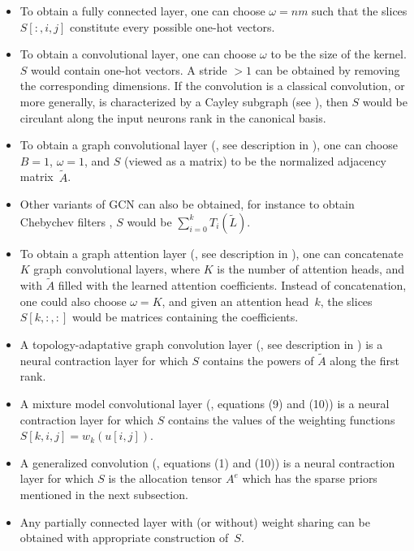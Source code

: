 \begin{itemize}%
\item[\ding{227}] To obtain a fully connected layer, one can choose $\omega = nm$ such that the slices $S[:,i,j]$ constitute every possible one-hot vectors.
\item[\ding{227}] To obtain a convolutional layer, one can choose $\omega$ to be the size of the kernel. $S$ would contain one-hot vectors. A stride $> 1$ can be obtained by removing the corresponding dimensions. If the convolution is a classical convolution, or more generally, is characterized by a Cayley subgraph (see ), then $S$ would be circulant along the input neurons rank in the canonical basis.
\item[\ding{227}] To obtain a graph convolutional layer (\cite{kipf2016semi}, see description in ), one can choose $B = 1$, $\omega = 1$, and $S$ (viewed as a matrix) to be the normalized adjacency matrix~$\widetilde{A}$.
\item[\ding{227}] Other variants of GCN can also be obtained, for instance to obtain Chebychev filters \citep{defferrard2016convolutional}, $S$ would be $\sum_{i=0}^k T_i(\widetilde{L})$.
\item[\ding{227}] To obtain a graph attention layer (\cite{velickovic2017graph}, see description in ), one can concatenate $K$ graph convolutional layers, where $K$ is the number of attention heads, and with $\widetilde{A}$ filled with the learned attention coefficients. Instead of concatenation, one could also choose $\omega=K$, and given an attention head~$k$, the slices $S[k,:,:]$ would be matrices containing the coefficients.
\item[\ding{227}] A topology-adaptative graph convolution layer (\cite{du2017topology}, see description in ) is a neural contraction layer for which $S$ contains the powers of $\widetilde{A}$ along the first rank.
\item[\ding{227}] A mixture model convolutional layer (\cite{monti2016geometric}, equations (9) and (10)) is a neural contraction layer for which $S$ contains the values of the weighting functions \ie $S[k,i,j] = w_k(u[i,j])$.
\item[\ding{227}] A generalized convolution (\cite{vialatte2016generalizing}, equations (1) and (10)) is a neural contraction layer for which $S$ is the allocation tensor $A^e$ which has the sparse priors mentioned in the next subsection.
\item[\ding{227}] Any partially connected layer with (or without) weight sharing can be obtained with appropriate construction of~$S$.
\end{itemize}

